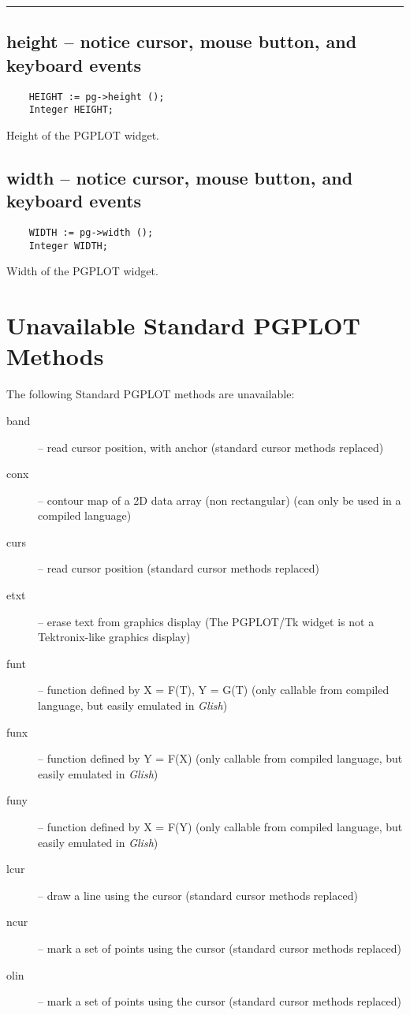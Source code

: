 \hrule

\subsection*{height -- notice cursor, mouse button, and keyboard events}
\begin{verbatim}
    HEIGHT := pg->height ();
    Integer HEIGHT;
\end{verbatim}
Height of the PGPLOT widget.

\subsection*{width -- notice cursor, mouse button, and keyboard events}
\begin{verbatim}
    WIDTH := pg->width ();
    Integer WIDTH;
\end{verbatim}
Width of the PGPLOT widget.



\section{Unavailable Standard PGPLOT Methods}

The following Standard PGPLOT methods are unavailable:

\begin{description}
\item[band] -- read cursor position, with anchor (standard cursor
     methods replaced)
\item[conx] -- contour map of a 2D data array (non rectangular) (can
     only be used in a compiled language)
\item[curs] -- read cursor position (standard cursor methods
     replaced)
\item[etxt] -- erase text from graphics display (The PGPLOT/Tk widget
     is not a Tektronix-like graphics display)
\item[funt] -- function defined by X = F(T), Y = G(T) (only callable
     from compiled language, but easily emulated in {\em Glish})
\item[funx] -- function defined by Y = F(X) (only callable from
     compiled language, but easily emulated in {\em Glish})
\item[funy] -- function defined by X = F(Y) (only callable from
     compiled language, but easily emulated in {\em Glish})
\item[lcur] -- draw a line using the cursor (standard cursor methods
     replaced)
\item[ncur] -- mark a set of points using the cursor (standard cursor
     methods replaced)
\item[olin] -- mark a set of points using the cursor (standard cursor
     methods replaced)
\end{description}

